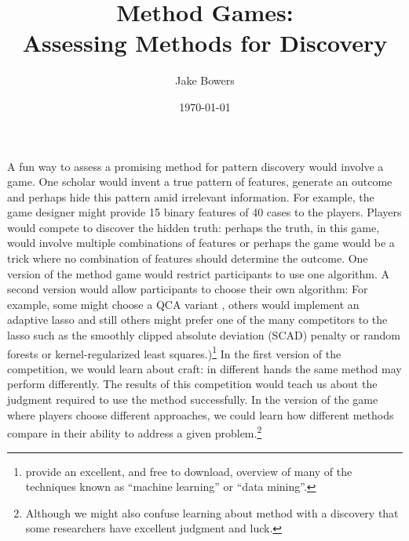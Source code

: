\documentclass[12pt]{article}
\title{Method Games:\\ Assessing Methods for Discovery}
\author{Jake Bowers}
\date{\today}
\begin{document}
\maketitle

A fun way to assess a promising method for pattern discovery would involve a
game.  One scholar would invent a true pattern of features, generate an
outcome and perhaps hide this pattern amid irrelevant information.  For
example, the game designer might provide 15 binary features of 40 cases to the
players. Players would compete to discover the hidden truth: perhaps the
truth, in this game, would involve multiple combinations of features or
perhaps the game would be a trick where no combination of features should
determine the outcome.  One version of the method game would restrict
participants to use one algorithm. A second version would allow participants
to choose their own algorithm: For example, some might choose a QCA variant
\citep{rihoux2008configurational}, others would implement an adaptive lasso
\citep{zou2006adaptive} and still others might prefer one of the many
competitors to the lasso such as the smoothly clipped absolute deviation
(SCAD) penalty \citep{fan2001variable} or random forests
\citep{breiman2001random} or kernel-regularized least
squares\citep{hainmueller2012kernel}.)\footnote{ \citet{hasttibfried09} provide an
  excellent, and free to download, overview of many of the techniques known as
  ``machine learning'' or ``data mining''.} In the first version of the
competition, we would learn about craft: in different hands the same method
may perform differently. The results of this competition would teach us
about the judgment required to use the method successfully.  In the version of
the game where players choose different approaches, we could learn how different methods
compare in their ability to address a given problem.\footnote{Although we might also
confuse learning about method with a discovery that some researchers have
excellent judgment and luck.}
\end{document}

